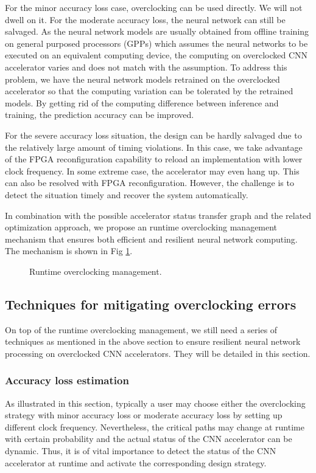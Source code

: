 For the minor accuracy loss case, overclocking can be used directly. 
We will not dwell on it. For the moderate accuracy loss, the neural network 
can still be salvaged. As the neural network models are usually obtained 
from offline training on general purposed processors (GPPs) which assumes the 
neural networks to be executed on an equivalent computing device, 
the computing on overclocked CNN accelerator varies and does not match 
with the assumption. To address this problem, we have the neural network models 
retrained on the overclocked accelerator so that the computing variation can be 
tolerated by the retrained models. By getting rid of the computing difference between 
inference and training, the prediction accuracy can be improved.

For the severe accuracy loss situation, the design can be hardly salvaged 
due to the relatively large amount of timing violations. In this case, 
we take advantage of the FPGA reconfiguration 
capability to reload an implementation with lower clock frequency. 
In some extreme case, the accelerator may even hang up. This can also be 
resolved with FPGA reconfiguration. However, the challenge is to 
detect the situation timely and recover the system automatically.

In combination with the possible accelerator status transfer graph and 
the related optimization approach, we propose an runtime overclocking 
management mechanism that ensures both efficient and resilient 
neural network computing. The mechanism is shown in Fig \ref{fig:runtime-management}.
\begin{figure}
    \caption{Runtime overclocking management.}
\label{fig:runtime-management}
\vspace{-1em}
\end{figure}

\subsection{Techniques for mitigating overclocking errors}
On top of the runtime overclocking management, we still need a series of techniques 
as mentioned in the above section to ensure resilient neural network processing 
on overclocked CNN accelerators. They will be detailed in this section.

\subsubsection{Accuracy loss estimation}
As illustrated in this section, typically a user may choose either the overclocking 
strategy with minor accuracy loss or moderate accuracy loss by setting up 
different clock frequency. Nevertheless, the critical paths 
may change at runtime with certain probability and the actual status of the CNN accelerator 
can be dynamic. Thus, it is of vital importance to detect the status of the CNN 
accelerator at runtime and activate the corresponding design strategy.

